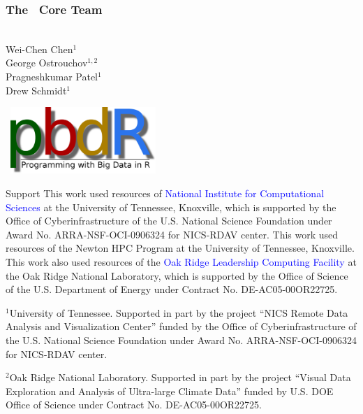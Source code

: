 \frame{
  \maketitle
}

\setcounter{footnote}{0}

\begin{frame}[noframenumbering]
\frametitle{The \pbdR\ Core Team}
\begin{minipage}{1\textwidth}
  \vspace{-.6cm}
\begin{minipage}{3.6cm}
\ \\[.8cm]
Wei-Chen Chen$^1$ \\
George Ostrouchov$^{1,2}$ \\
Pragneshkumar Patel$^1$ \\
Drew Schmidt$^1$\\[2ex]
\end{minipage}
\begin{minipage}{7cm}
  \ \hfill \includegraphics[width=5.5cm]{../common/pics/newpbdr}
\end{minipage}
\end{minipage}

\vspace{-.4cm}
\begin{block}{Support}\tiny
  This work used resources of \textcolor{blue}{National Institute for
  Computational Sciences} at the University of Tennessee, Knoxville,
  which is supported by the Office of Cyberinfrastructure of the
  U.S. National Science Foundation under Award  No. ARRA-NSF-OCI-0906324 
  for NICS-RDAV center. This work used resources of the Newton HPC 
  Program at the University of Tennessee, Knoxville.
  This work also used resources of the \textcolor{blue}{Oak Ridge
  Leadership Computing Facility} at the Oak Ridge National
  Laboratory, which is supported by the Office of Science of the
  U.S. Department of Energy under Contract No. DE-AC05-00OR22725.

  \vspace{1em}$^1$University of Tennessee. Supported in part by the
  project ``NICS Remote Data Analysis and Visualization Center''
  funded by the Office of Cyberinfrastructure of the U.S. National
  Science Foundation under Award No. ARRA-NSF-OCI-0906324 for
  NICS-RDAV center.
  
  \tiny \vspace{1em}$^2$Oak Ridge National Laboratory. Supported in
  part by the project ``Visual Data Exploration and Analysis of
  Ultra-large Climate Data'' funded by U.S. DOE Office of Science
  under Contract No. DE-AC05-00OR22725.
\end{block}
\end{frame}

